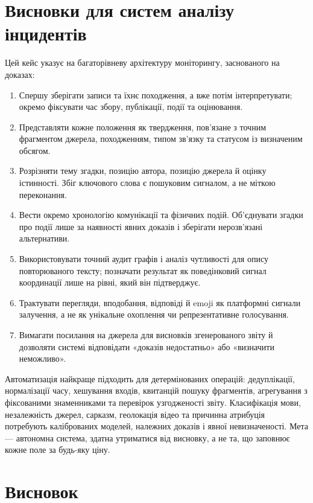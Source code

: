 \section{Висновки для систем аналізу інцидентів}

Цей кейс указує на багаторівневу архітектуру моніторингу, заснованого на доказах:
\begin{enumerate}
\item Спершу зберігати записи та їхнє походження, а вже потім інтерпретувати; окремо фіксувати час збору, публікації, події та оцінювання.
\item Представляти кожне положення як твердження, пов'язане з точним фрагментом джерела, походженням, типом зв'язку та статусом із визначеним обсягом.
\item Розрізняти тему згадки, позицію автора, позицію джерела й оцінку істинності. Збіг ключового слова є пошуковим сигналом, а не міткою переконання.
\item Вести окремо хронологію комунікації та фізичних подій. Об'єднувати згадки про події лише за наявності явних доказів і зберігати нерозв'язані альтернативи.
\item Використовувати точний аудит графів і аналіз чутливості для опису повторюваного тексту; позначати результат як поведінковий сигнал координації лише на рівні, який він підтверджує.
\item Трактувати перегляди, вподобання, відповіді й emoji як платформні сигнали залучення, а не як унікальне охоплення чи репрезентативне голосування.
\item Вимагати посилання на джерела для висновків згенерованого звіту й дозволяти системі відповідати «доказів недостатньо» або «визначити неможливо».
\end{enumerate}

Автоматизація найкраще підходить для детермінованих операцій: дедуплікації, нормалізації часу, хешування входів, квитанцій пошуку фрагментів, агрегування з фіксованими знаменниками та перевірок узгодженості звіту. Класифікація мови, незалежність джерел, сарказм, геолокація відео та причинна атрибуція потребують каліброваних моделей, належних доказів і явної невизначеності. Мета — автономна система, здатна утриматися від висновку, а не та, що заповнює кожне поле за будь-яку ціну.

\section{Висновок}

